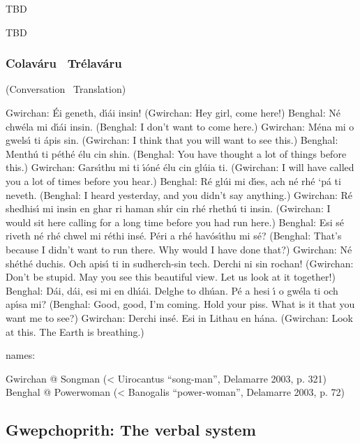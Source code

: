 \begingroup
\fontsize{10pt}{12pt}\selectfont
\begin{leftbubbles}TBD\end{leftbubbles}
\begin{rightbubbles}TBD\end{rightbubbles}
\endgroup

\newpage
\subsubsection{Colav\'{a}ru \textendash\ Tr\'{e}lav\'{a}ru}
(Conversation \textendash\ Translation)

Gwirchan: \'{E}i geneth, d\'{\i}\'{a}i insin! 
(Gwirchan: Hey girl, come here!)
Benghal: N\'{e} chw\'{e}la mi d\'{\i}\'{a}i insin.
(Benghal: I don't want to come here.)
Gwirchan: M\'{e}na mi o gwels\'{\i} ti \'{a}pis sin.
(Gwirchan: I think that you will want to see this.)
Benghal: Menth\'{u} ti p\'{e}th\'{e} \'{e}lu cin shin.
(Benghal: You have thought a lot of things before this.)
Gwirchan: Gars\'{\i}thu mi ti \'{\i}\'{o}n\'{e} \'{e}lu cin gl\'{u}ia ti.
(Gwirchan: I will have called you a lot of times before you hear.)
Benghal: R\'{e} gl\'{u}i mi d\'{\i}es, ach n\'{e} rh\'{e} ‘p\'{a} ti neveth.
(Benghal: I heard yesterday, and you didn’t say anything.)
Gwirchan: R\'{e} shedhis\'{\i} mi insin en ghar ri haman sh\'{\i}r cin rh\'{e} rheth\'{u} ti insin.
(Gwirchan: I would sit here calling for a long time before you had run here.)
Benghal: Esi s\'{e} riveth n\'{e} rh\'{e} chwel mi r\'{e}thi ins\'{e}. P\'{e}ri a rh\'{e} hav\'{o}s\'{\i}thu mi s\'{e}?
(Benghal: That’s because I didn’t want to run there. Why would I have done that?)
Gwirchan: N\'{e} sh\'{e}th\'{e} duchis. Och apis\'{\i} ti in sudherch-sin tech. Derchi ni sin rochan!
(Gwirchan: Don't be stupid. May you see this beautiful view. Let us look at it together!)
Benghal: D\'{a}i, d\'{a}i, esi mi en dh\'{\i}\'{a}i. Delghe to dh\'{u}an. P\'{e} a hesi \'{\i} o gw\'{e}la ti och ap\'{\i}sa mi?
(Benghal: Good, good, I'm coming. Hold your piss. What is it that you want me to see?)
Gwirchan: Derchi ins\'{e}. Esi in Lithau en h\'{a}na.
(Gwirchan: Look at this. The Earth is breathing.)

names: 

Gwirchan @ Songman (< Uirocantus ``song-man'', Delamarre 2003, p. 321)
Benghal @ Powerwoman (< Banogalis ``power-woman'', Delamarre 2003, p. 72)

\subsection{Gwepchoprith: The verbal system}
